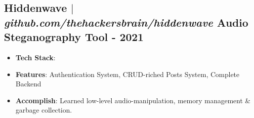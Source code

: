 \documentclass[11pt]{article} %
\begin{document}
\subsection{Hiddenwave $|$ \normalfont\textit{github.com/thehackersbrain/hiddenwave} \hfill Audio Steganography Tool - \textbf{2021}}
\vspace{3pt}
\begin{itemize}
  \item \textbf{Tech Stack}: 
  \item \textbf{Features}: Authentication System, CRUD-riched Posts System, Complete Backend
  \item \textbf{Accomplish}: Learned low-level audio-manipulation, memory management \& garbage collection.
\end{itemize}
\end{document}
